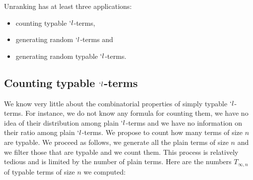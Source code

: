 \documentclass{sig-alternate}
\newcommand{\nbt}[1]{T_{\infty,#1}}
\begin{document}
Unranking has at least three applications:
\begin{itemize}
\item counting typable $`l$-terms,
\item generating random $`l$-terms and
\item generating random
  typable $`l$-terms.
\end{itemize}


\subsection{Counting typable $`l$-terms}
\label{sec:cont_typ}

We know very little about the combinatorial properties of simply typable $`l$-terms.
For instance, we do not know any formula for counting them, we have no idea of their
distribution among plain $`l$-terms and we have no information on their ratio among
plain $`l$-terms.  We propose to count how many terms of size $n$ are typable.  We
proceed as follows, we generate all the plain terms of size $n$ and we filter those
that are typable and we count them.  This process is relatively tedious and is
limited by the number of plain terms. Here are the numbers $\nbt{n}$ of typable terms
of size $n$ we computed:
\end{document}
